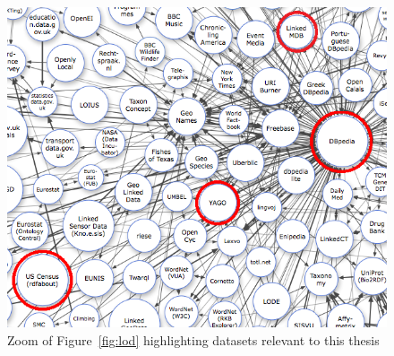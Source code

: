 \begin{figure}[h!]
\begin{center}
  \includegraphics[width=1\linewidth]{./Figures/lod-zoom.png}
\end{center}
\caption{Zoom of Figure~\ref{fig:lod} highlighting datasets relevant to this thesis}
\label{fig:lodZoom}
\end{figure}
